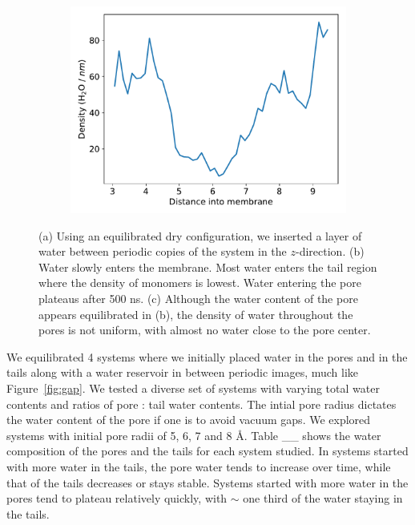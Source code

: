 \documentclass{article}
\begin{document}
\begin{figure}[!htb]
\begin{subfigure}{0.37\textwidth}
  \caption{}\label{fig:equilibrated_water_penetration}
  \end{subfigure}  
  \begin{subfigure}{0.37\textwidth}
  \includegraphics[width=\linewidth]{penetration_density.pdf}
  \caption{}\label{fig:penetration_density}
  \end{subfigure}  
  \caption{(a) Using an equilibrated dry configuration, we inserted a layer of water between
           periodic copies of the system in the $z$-direction. (b) Water slowly enters 
	   the membrane. Most water enters the tail region where the density of monomers is
	   lowest. Water entering the pore plateaus after 500 ns. (c) Although the water
	   content of the pore appears equilibrated in (b), the density of water throughout
	   the pores is not uniform, with almost no water close to the pore center.
  }\label{fig:gap_solvation}
  \end{figure}

  We equilibrated 4 systems where we initially placed water in the pores and in
  the tails along with a water reservoir in between periodic images, much like
  Figure~\ref{fig:gap}. We tested a diverse set of systems with varying total
  water contents and ratios of pore : tail water contents. The intial pore radius
  dictates the water content of the pore if one is to avoid vacuum gaps. We
  explored systems with initial pore radii of 5, 6, 7 and 8 \AA. Table \_\_ shows
  the water composition of the pores and the tails for each system studied. In
  systems started with more water in the tails, the pore water tends to increase
  over time, while that of the tails decreases or stays stable. Systems started
  with more water in the pores tend to plateau relatively quickly, with $\sim$
  one third of the water staying in the tails.   
\end{document}
